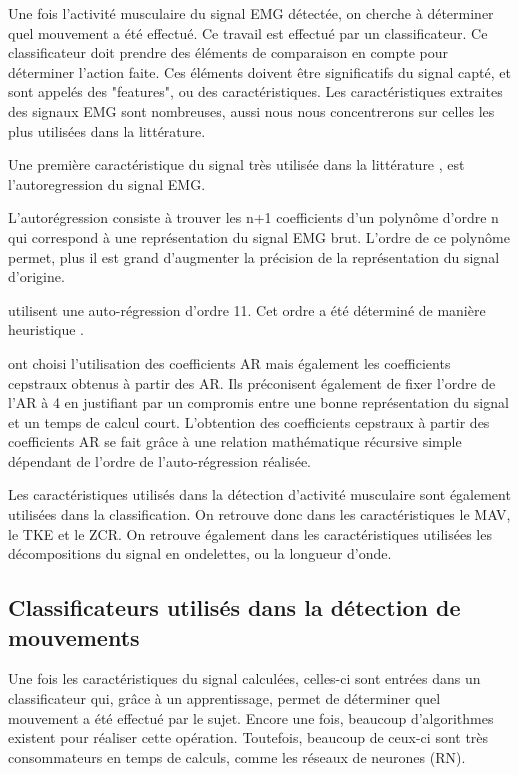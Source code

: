 \documentclass[letterpaper, twoside, 12pt, memoire, creativecommons, hyperref]{thETS}
\begin{document}
Une fois l’activité musculaire du signal EMG détectée, on cherche à déterminer quel mouvement a été effectué. Ce travail est effectué par un classificateur. Ce classificateur doit prendre des éléments de comparaison en compte pour déterminer l’action faite. Ces éléments doivent être significatifs du signal capté, et sont appelés des "features", ou des caractéristiques. 
Les caractéristiques extraites des signaux EMG sont nombreuses, aussi nous nous concentrerons sur celles les plus utilisées dans la littérature. 

Une première caractéristique du signal très utilisée dans la littérature \citep{Chang1996, Peleg2002, Maheu2011}, est l'autoregression du signal EMG.

L’autorégression consiste à trouver les n+1 coefficients d’un polynôme d’ordre n  qui correspond à une représentation du signal EMG brut. L'ordre de ce polynôme permet, plus il est grand d'augmenter la précision de la représentation du signal d'origine. 

\cite{Peleg2002} utilisent une auto-régression d’ordre 11. Cet ordre a été déterminé de manière heuristique \citep{Peleg2002}.

\cite{Chang1996} ont choisi l'utilisation des coefficients AR mais également les coefficients cepstraux obtenus à partir des AR. Ils préconisent également de fixer l’ordre de l’AR à 4 en justifiant par un compromis entre une bonne représentation du signal  et un temps de calcul court. L’obtention des coefficients cepstraux à partir des coefficients AR se fait grâce à une relation mathématique récursive simple dépendant de l’ordre de l'auto-régression réalisée. %

Les caractéristiques utilisés dans la détection d'activité musculaire sont également utilisées dans la classification. On retrouve donc dans les caractéristiques le MAV, le TKE et le ZCR. On retrouve également dans les caractéristiques utilisées les décompositions du signal en ondelettes, ou la longueur d'onde.

\subsection{Classificateurs utilisés dans la détection de mouvements}

Une fois les caractéristiques du signal calculées,  celles-ci sont entrées dans un classificateur qui, grâce à un apprentissage, permet de déterminer quel mouvement a été effectué par le sujet. Encore une fois, beaucoup d’algorithmes existent pour réaliser cette opération. Toutefois, beaucoup de ceux-ci sont très consommateurs en temps de calculs, comme les réseaux de neurones (RN).
\end{document}
